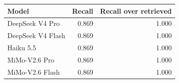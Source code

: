 \begin{tabular}{lrr}
\toprule
Model & Recall & Recall over retrieved \\
\midrule
DeepSeek V4 Pro & 0.869 & 1.000 \\
DeepSeek V4 Flash & 0.869 & 1.000 \\
Haiku 5.5 & 0.869 & 1.000 \\
MiMo-V2.6 Pro & 0.869 & 1.000 \\
MiMo-V2.6 Flash & 0.869 & 1.000 \\
\bottomrule
\end{tabular}
